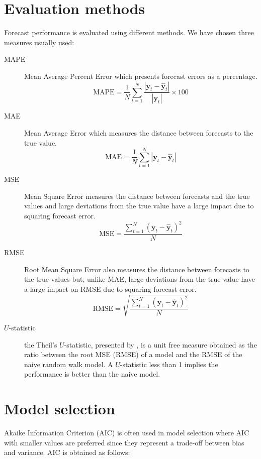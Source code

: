 \section{Evaluation methods} \label{sec:evaluation}

Forecast performance is evaluated using different methods. We have chosen three
measures usually used:
\begin{description}
\item[MAPE] Mean Average Percent Error which presents forecast errors as a
percentage.
\begin{equation}\label{eq:MAPE}
\text{MAPE} = \frac{1}{N} \sum_{t=1}^{N} 
\frac{\left|\mathbf{y}_t-\hat{\mathbf{y}}_t\right|}{\left|\mathbf{y}_t\right|}
 \times 100 
\end{equation}
\item[MAE] Mean Average Error which measures the distance between forecasts to the
true value.
\begin{equation}\label{eq:MAE}
\text{MAE} = \frac{1}{N} \sum_{t=1}^{N} 
\left| 
\mathbf{y}_t-\hat{\mathbf{y}}_t
\right| 
\end{equation}
\item[MSE]  Mean Square Error measures the distance between forecasts
and the true values and large deviations from the true value have a
large impact due to squaring forecast error.
\begin{equation}\label{eq:MSE}
\text{MSE} = 
\frac{\displaystyle \sum_{t=1}^{N} (\mathbf{y}_t-\hat{\mathbf{y}}_t)^2}{N}
\end{equation}
\item[RMSE] Root Mean Square Error also measures the distance between forecasts
to the true values but, unlike MAE, large deviations from the true value have a
large impact on RMSE due to squaring forecast error.
\begin{equation}\label{eq:RMSE}
\text{RMSE} = \sqrt{
\frac{\displaystyle \sum_{t=1}^{N} (\mathbf{y}_t-\hat{\mathbf{y}}_t)^2}{N}}
\end{equation}
\item[$U$-statistic] the Theil's $U$-statistic, presented by
\cite{theil1966}, is a unit free measure obtained as the ratio between the root
MSE (RMSE) of a model and the RMSE of the naive random walk model. A
$U$-statistic less than 1 implies the performance is better than the naive
model.
\end{description}


\section{Model selection} \label{sec:pselection}
Akaike Information Criterion (AIC) is often used in model selection where AIC
with smaller values are preferred since they represent a trade-off between bias
and variance.  AIC is obtained as follows:

